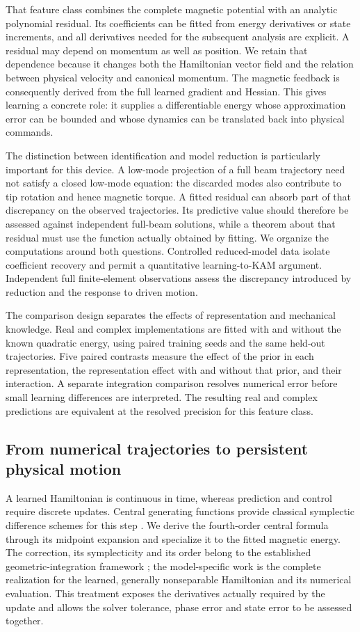 That feature class combines the complete magnetic potential with an analytic polynomial residual. Its coefficients can be fitted from energy derivatives or state increments, and all derivatives needed for the subsequent analysis are explicit. A residual may depend on momentum as well as position. We retain that dependence because it changes both the Hamiltonian vector field and the relation between physical velocity and canonical momentum. The magnetic feedback is consequently derived from the full learned gradient and Hessian. This gives learning a concrete role: it supplies a differentiable energy whose approximation error can be bounded and whose dynamics can be translated back into physical commands.

The distinction between identification and model reduction is particularly important for this device. A low-mode projection of a full beam trajectory need not satisfy a closed low-mode equation: the discarded modes also contribute to tip rotation and hence magnetic torque. A fitted residual can absorb part of that discrepancy on the observed trajectories. Its predictive value should therefore be assessed against independent full-beam solutions, while a theorem about that residual must use the function actually obtained by fitting. We organize the computations around both questions. Controlled reduced-model data isolate coefficient recovery and permit a quantitative learning-to-KAM argument. Independent full finite-element observations assess the discrepancy introduced by reduction and the response to driven motion.

The comparison design separates the effects of representation and mechanical knowledge. Real and complex implementations are fitted with and without the known quadratic energy, using paired training seeds and the same held-out trajectories. Five paired contrasts measure the effect of the prior in each representation, the representation effect with and without that prior, and their interaction. A separate integration comparison resolves numerical error before small learning differences are interpreted. The resulting real and complex predictions are equivalent at the resolved precision for this feature class.

\subsection{From numerical trajectories to persistent physical motion}
A learned Hamiltonian is continuous in time, whereas prediction and control require discrete updates. Central generating functions provide classical symplectic difference schemes for this step \citep{feng}. We derive the fourth-order central formula through its midpoint expansion and specialize it to the fitted magnetic energy. The correction, its symplecticity and its order belong to the established geometric-integration framework \citep{hairer}; the model-specific work is the complete realization for the learned, generally nonseparable Hamiltonian and its numerical evaluation. This treatment exposes the derivatives actually required by the update and allows the solver tolerance, phase error and state error to be assessed together.


